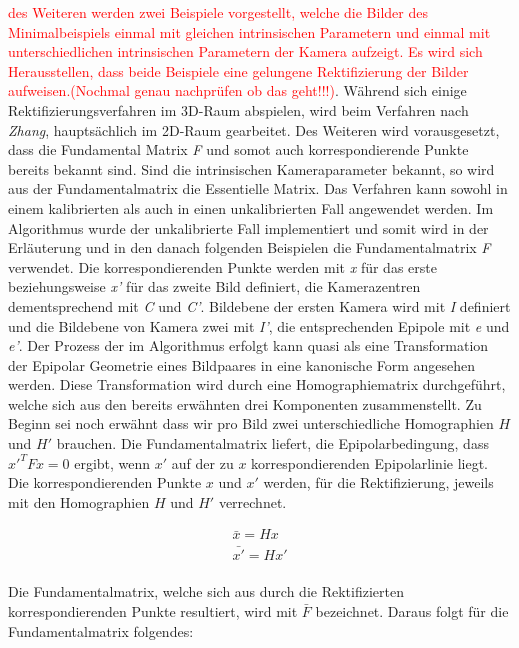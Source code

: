 \textcolor{red}{des Weiteren werden zwei Beispiele vorgestellt, welche die Bilder des Minimalbeispiels einmal mit gleichen intrinsischen Parametern und einmal mit unterschiedlichen intrinsischen Parametern der Kamera aufzeigt. Es wird sich Herausstellen, dass beide Beispiele eine gelungene Rektifizierung der Bilder aufweisen.(Nochmal genau nachprüfen ob das geht!!!)}. Während sich einige Rektifizierungsverfahren im 3D-Raum abspielen, wird beim Verfahren nach \textit{Zhang}, hauptsächlich im 2D-Raum gearbeitet. Des Weiteren wird vorausgesetzt, dass die Fundamental Matrix \textit{F} und somot auch korrespondierende Punkte bereits bekannt sind. Sind die intrinsischen Kameraparameter bekannt, so wird aus der Fundamentalmatrix die Essentielle Matrix. Das Verfahren kann sowohl in einem kalibrierten als auch in einen unkalibrierten Fall angewendet werden\cite{ZZ}. Im Algorithmus wurde der unkalibrierte Fall implementiert und somit wird in der Erläuterung und in den danach folgenden Beispielen die Fundamentalmatrix \textit{F} verwendet. Die korrespondierenden Punkte werden mit \textit{x} für das erste beziehungsweise \textit{x'} für das zweite Bild definiert, die Kamerazentren dementsprechend mit \textit{C} und \textit{C'}. Bildebene der ersten Kamera wird mit \textit{I} definiert und die Bildebene von Kamera zwei mit \textit{I'}, die entsprechenden Epipole mit \textit{e} und \textit{e'}. Der Prozess der im Algorithmus erfolgt kann quasi als eine Transformation der Epipolar Geometrie eines Bildpaares in eine kanonische Form angesehen werden. Diese Transformation wird durch eine Homographiematrix durchgeführt, welche sich aus den bereits erwähnten drei Komponenten zusammenstellt. Zu Beginn sei noch erwähnt dass wir pro Bild zwei unterschiedliche Homographien \ensuremath{H} und \ensuremath{H'} brauchen. Die Fundamentalmatrix liefert, die Epipolarbedingung, dass $x'^TFx=0$ ergibt, wenn $x'$ auf der zu $x$ korrespondierenden Epipolarlinie liegt. Die korrespondierenden Punkte $x$ und $x'$ werden, für die Rektifizierung, jeweils mit den Homographien $H$ und $H'$ verrechnet.

\begin{gather}
	\bar{x}= Hx\\
	\bar{x'}= Hx'
\end{gather}\\

Die Fundamentalmatrix, welche sich aus durch die Rektifizierten korrespondierenden Punkte resultiert, wird mit $\bar{F}$ bezeichnet. Daraus folgt für die Fundamentalmatrix folgendes:

